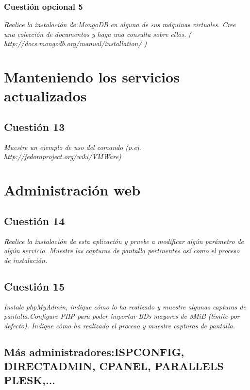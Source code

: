 \subsubsection{Cuestión opcional 5}
\textit{Realice la instalación de MongoDB en alguna de sus máquinas virtuales. Cree una colección de documentos y haga una consulta sobre ellos. ( http://docs.mongodb.org/manual/installation/ )}


\section{Manteniendo los servicios actualizados}
\subsection{Cuestión 13}
\textit{Muestre un ejemplo de uso del comando (p.ej. http://fedoraproject.org/wiki/VMWare)}


\section{Administración web}
\subsection{Cuestión 14}
\textit{Realice la instalación de esta aplicación y pruebe a modificar algún parámetro de algún servicio. Muestre las capturas de pantalla pertinentes así como el proceso de instalación.}

\subsection{Cuestión 15}
\textit{Instale phpMyAdmin, indique cómo lo ha realizado y muestre algunas capturas de pantalla.Configure PHP para poder importar BDs mayores de 8MiB (límite por defecto). Indique cómo ha realizado el proceso y muestre capturas de pantalla.}


\subsection{Más administradores:ISPCONFIG, DIRECTADMIN, CPANEL, PARALLELS PLESK,... }
